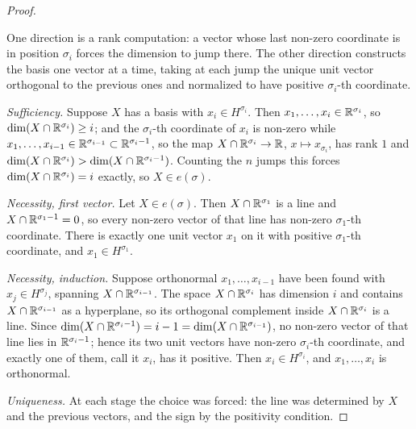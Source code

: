 \begin{proof}
\begin{strategy}
One direction is a rank computation: a vector whose last non-zero coordinate is
in position $\sigma_i$ forces the dimension to jump there. The other direction
constructs the basis one vector at a time, taking at each jump the unique unit
vector orthogonal to the previous ones and normalized to have positive
$\sigma_i$-th coordinate.
\end{strategy}

 \emph{Sufficiency.} Suppose $X$ has a basis with $x_i\in H^{\sigma_i}$.
Then $x_1,\dots,x_i\in\mathbb{R}^{\sigma_i}$, so $\dim(X\cap\mathbb{R}^{\sigma_i})\ge i$; and
the $\sigma_i$-th coordinate of $x_i$ is non-zero while
$x_1,\dots,x_{i-1}\in\mathbb{R}^{\sigma_{i-1}}\subset\mathbb{R}^{\sigma_i-1}$, so the map
$X\cap\mathbb{R}^{\sigma_i}\to\mathbb{R}$, $x\mapsto x_{\sigma_i}$, has rank $1$ and
$\dim(X\cap\mathbb{R}^{\sigma_i})>\dim(X\cap\mathbb{R}^{\sigma_i-1})$. Counting the $n$ jumps
this forces $\dim(X\cap\mathbb{R}^{\sigma_i})=i$ exactly, so $X\in e(\sigma)$.

 \emph{Necessity, first vector.} Let $X\in e(\sigma)$. Then
$X\cap\mathbb{R}^{\sigma_1}$ is a line and $X\cap\mathbb{R}^{\sigma_1-1}=0$, so every non-zero
vector of that line has non-zero $\sigma_1$-th coordinate. There is exactly one
unit vector $x_1$ on it with positive $\sigma_1$-th coordinate, and
$x_1\in H^{\sigma_1}$.

 \emph{Necessity, induction.} Suppose orthonormal
$x_1,\dots,x_{i-1}$ have been found with $x_j\in H^{\sigma_j}$, spanning
$X\cap\mathbb{R}^{\sigma_{i-1}}$. The space $X\cap\mathbb{R}^{\sigma_i}$ has dimension $i$ and
contains $X\cap\mathbb{R}^{\sigma_{i-1}}$ as a hyperplane, so its orthogonal complement
inside $X\cap\mathbb{R}^{\sigma_i}$ is a line. Since
$\dim(X\cap\mathbb{R}^{\sigma_i-1})=i-1=\dim(X\cap\mathbb{R}^{\sigma_{i-1}})$, no non-zero
vector of that line lies in $\mathbb{R}^{\sigma_i-1}$; hence its two unit vectors have
non-zero $\sigma_i$-th coordinate, and exactly one of them, call it $x_i$, has
it positive. Then $x_i\in H^{\sigma_i}$, and $x_1,\dots,x_i$ is orthonormal.

 \emph{Uniqueness.} At each stage the choice was forced: the line was
determined by $X$ and the previous vectors, and the sign by the positivity
condition.
\end{proof}

